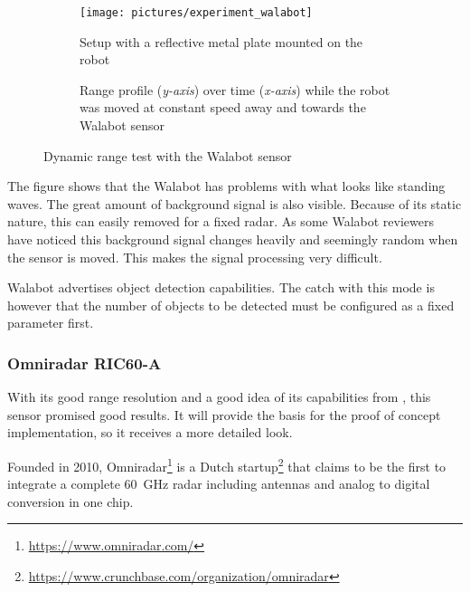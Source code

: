 \begin{figure}[htbp]
    \centering


    \begin{subfigure}[t]{0.2618405121\textwidth}
        \texttt{[image: pictures/experiment\_walabot]}
        \caption{Setup with a reflective metal plate mounted on the robot}
        \label{fig:walabot_dynamic_setup}
    \end{subfigure}%
    \hfill%
    \begin{subfigure}[t]{0.68815948789\textwidth}
        \def\svgwidth{\linewidth}
        
        \caption{Range profile (\textit{y-axis}) over time (\textit{x-axis}) while the robot was moved at constant speed away and towards the Walabot sensor}
        \label{fig:walabot_dynamic_data}
    \end{subfigure}%
    \caption{Dynamic range test with the Walabot sensor}
\end{figure}

The figure shows that the Walabot has problems with what looks like
standing waves. The great amount of background signal is also visible.
Because of its static nature, this can easily removed for a fixed radar.
As some Walabot reviewers have noticed \cite{Valens2016} this background
signal changes heavily and seemingly random when the sensor is moved.
This makes the signal processing very difficult.

Walabot advertises object detection capabilities. The catch with this
mode is however that the number of objects to be detected must be
configured as a fixed parameter first.

\subsubsection{Omniradar RIC60-A}\label{omniradar}

With its good range resolution and a good idea of its capabilities from \cite{Ernst2016}, this sensor promised good results. It will provide the basis for the proof of concept implementation, so it receives a more detailed look.

Founded in 2010, Omniradar\footnote{\url{https://www.omniradar.com/}} is a Dutch
startup\footnote{\url{https://www.crunchbase.com/organization/omniradar}} that
claims to be the first to integrate a complete \SI{60}{GHz} radar including
antennas and analog to digital conversion in one chip.

